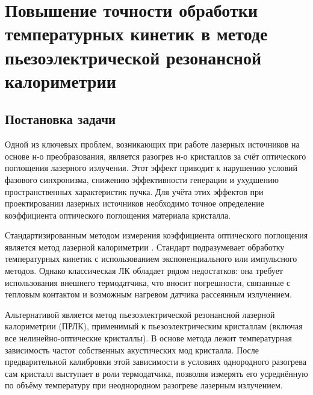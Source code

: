\chapter{Повышение точности обработки температурных кинетик в методе пьезоэлектрической резонансной калориметрии}


\section{Постановка задачи}

Одной из ключевых проблем, возникающих при работе лазерных источников на основе н-о преобразования, является разогрев н-о кристаллов за счёт оптического поглощения лазерного излучения. Этот  эффект приводит к нарушению условий фазового синхронизма, снижению эффективности генерации и ухудшению пространственных характеристик пучка. Для учёта этих эффектов при проектировании лазерных источников необходимо точное определение коэффициента оптического поглощения материала кристалла.

Стандартизированным методом измерения коэффициента оптического поглощения является метод лазерной калориметрии \cite{iso}. Стандарт подразумевает обработку температурных кинетик с использованием экспоненциального или импульсного методов. Однако классическая ЛК обладает рядом недостатков: она требует использования внешнего термодатчика, что вносит погрешности, связанные с тепловым контактом и возможным нагревом датчика рассеянным излучением.

Альтернативой является метод пьезоэлектрической резонансной лазерной калориметрии (ПРЛК), применимый к пьезоэлектрическим кристаллам (включая все нелинейно-оптические кристаллы). В основе метода лежит температурная зависимость частот собственных акустических мод кристалла. После предварительной калибровки этой зависимости в условиях однородного разогрева сам кристалл выступает в роли термодатчика, позволяя измерять его усреднённую по объёму температуру при неоднородном разогреве лазерным излучением.

